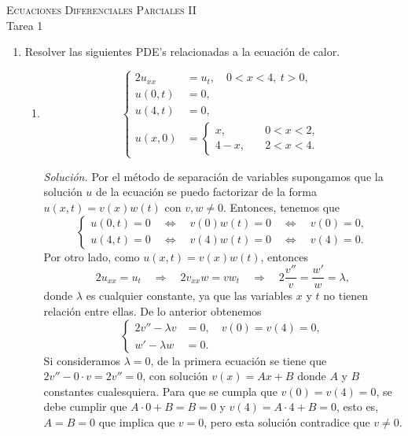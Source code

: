 \documentclass[12pt]{article}
\newcommand{\sol}{\textit{Solución. }}
\newcommand{\Imp}{\quad\Longrightarrow\quad}
\newcommand{\Ssi}{\quad\Longleftrightarrow\quad}
\renewcommand{\l}{\lambda}
\begin{document}
    \pagestyle{empty}
    \begin{center}
        {\textsc{Ecuaciones Diferenciales Parciales II} \\
        \medskip 
        \large{Tarea 1}}
    \end{center}
    
    \bigskip
    
    \begin{enumerate}
        \item Resolver las siguientes PDE's relacionadas a la ecuación de calor.

        \begin{enumerate}
            \item \[
            \begin{cases}
                2u_{xx} &= u_t,\quad0<x<4,~t>0,\\
                u(0,t) &= 0,\\
                u(4,t) &= 0,\\
                u(x,0) &= \begin{cases}
                    x,\quad   &0<x<2,\\
                    4-x,\quad &2<x<4.
                \end{cases}
            \end{cases}
            \]

            \sol Por el método de separación de variables supongamos que la solución $u$ de la ecuación se puedo factorizar de la forma $u(x,t)=v(x) w(t)$ con $v,w\neq0$. Entonces, tenemos que
            \[
            \begin{cases}
                u(0,t) =0 \Ssi v(0) w(t) =0 \Ssi  v(0)=0,\\
                u(4,t) =0 \Ssi v(4) w(t) =0 \Ssi v(4) = 0.
            \end{cases}
            \]
            Por otro lado, como $u(x,t)=v(x) w(t)$, entonces
            \[ 2u_{xx} = u_t \Imp 2v_{xx}w = vw_t\Imp 2\frac{v''}{v} = \frac{w'}{w}=\l, \]
            donde $\l$ es cualquier constante, ya que las variables $x$ y $t$ no tienen relación entre ellas. De lo anterior obtenemos
            \[
            \begin{cases}
                2v''-\l v &=0, \quad v(0)=v(4)=0,\\
                w'-\l w &=0.
            \end{cases}
            \]
            Si consideramos $\l=0$, de la primera ecuación se tiene que $2v''-0\cdot v = 2v'' =0$, con solución $v(x)=Ax+B$ donde $A$ y $B$ constantes cualesquiera. Para que se cumpla que $v(0)=v(4)=0$, se debe cumplir que $A\cdot0+B=B=0$ y $v(4)=A\cdot 4+B=0$, esto es, $A=B=0$ que implica que $v=0$, pero esta solución contradice que $v\neq 0$.
            

\end{enumerate}
\end{enumerate}
\end{document}
